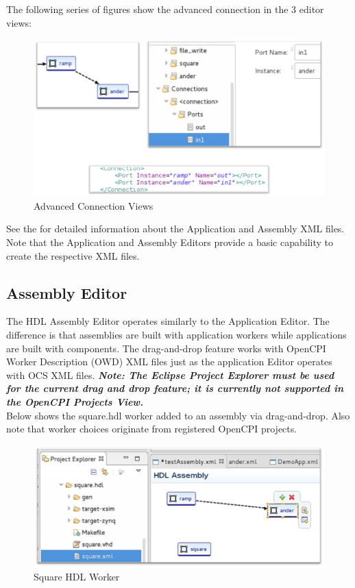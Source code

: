 \documentclass[10pt, a4paper, oneside]{article}
\begin{document}
The following series of figures show the advanced connection in the 3 editor views:
\begin{figure}[h!]
	\centering
	\caption{Advanced Connection Views}{}
	\includegraphics[width=.85\textwidth]{AdvancedConnectionViews.png}
 \end{figure}

See the  for detailed information about the Application and Assembly XML files.
Note that the Application and Assembly Editors provide a basic capability to create the respective XML files.
\subsection{Assembly Editor}
The HDL Assembly Editor operates similarly to the Application Editor. The difference is that assemblies are built with application workers while applications are built with components. The drag-and-drop feature works with OpenCPI Worker Description (OWD) XML files just as the application Editor operates with OCS XML files. \textbf{\emph{Note: The Eclipse Project Explorer must be used for the current drag and drop feature; it is currently not supported in the OpenCPI Projects View.}}\\
Below shows the square.hdl worker added to an assembly via drag-and-drop. Also note that worker choices originate from registered OpenCPI projects.
\begin{figure}[h!]
	\centering
	\caption{Square HDL Worker}{}
	\includegraphics[width=.75\textwidth]{SquareHDLWorker.png}
 \end{figure}
\end{document}
